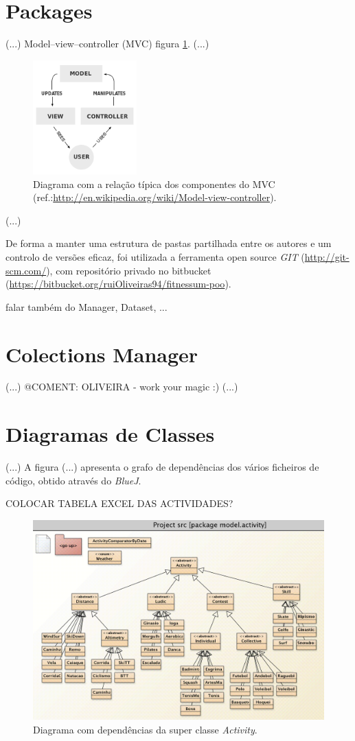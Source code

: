 \documentclass[a4paper,10pt]{report}
\begin{document}
\section{Packages}
\label{sec:packages}
(...)
Model–view–controller (MVC) figura \ref{fig:mvc}.
(...)
\begin{figure}
\centering
\includegraphics[width=4cm]{MVC-Process.png}
\caption{Diagrama com a relação típica dos componentes do MVC (ref.:\url{http://en.wikipedia.org/wiki/Model-view-controller}).}
\label{fig:mvc}
\end{figure}
(...)

De forma a manter uma estrutura de pastas partilhada entre os autores e um controlo de versões eficaz, 
foi utilizada a ferramenta open source \emph{GIT} (\url{http://git-scm.com/}), 
com repositório privado no bitbucket (\url{https://bitbucket.org/ruiOliveiras94/fitnessum-poo}).

falar também do Manager, Dataset, ...

\section{Colections Manager}
\label{sec:manager}
(...)
@COMENT: OLIVEIRA - work your magic :)
(...)

\section{Diagramas de Classes}
\label{sec:classes}
(...)
A figura (...) apresenta o grafo de dependências dos vários ficheiros de código, obtido através do \emph{BlueJ}.

COLOCAR TABELA EXCEL DAS ACTIVIDADES?

\begin{figure}
\centering
\includegraphics[width=\textwidth]{diagramaActivities.png}
\caption{Diagrama com dependências da super classe \emph{Activity}.}
\label{fig:activityDiagram}
\end{figure}
\end{document}

